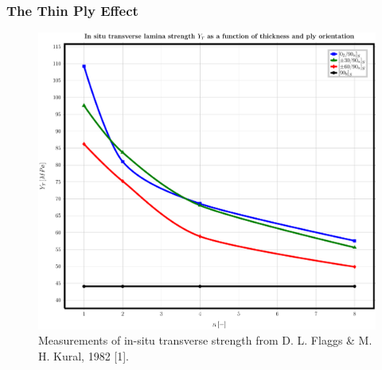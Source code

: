 \documentclass[first,firstsupp,lastsupp,handout,last,hyperref,table]{ETHclass}
\begin{document}
\begin{frame}
\frametitle{The Thin Ply Effect}
\vspace{-0.5cm}
\centering
%
\begin{figure}[!h]
\centering
\includegraphics[height=0.75\textheight]{Flaggs-Kural_InSituTransverseStrength.pdf}
\caption{\tiny Measurements of in-situ transverse strength from D. L. Flaggs \& M. H. Kural, 1982 [1].}
 \label{fig:in-situ-strength}
\end{figure}
\end{frame}
\end{document}
